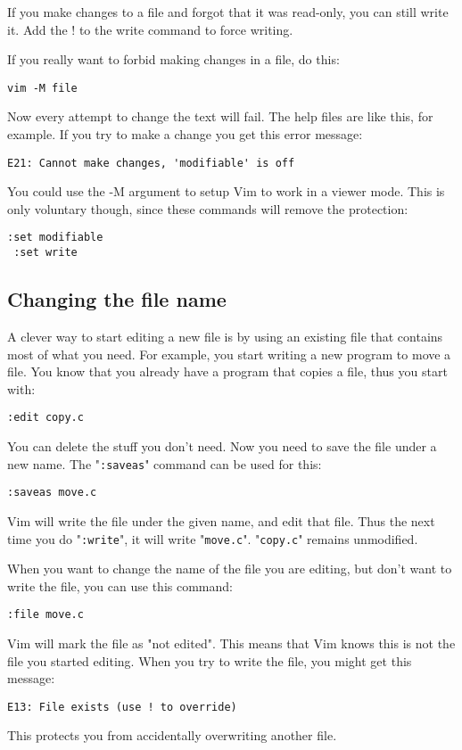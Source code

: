 If you make changes to a file and forgot that it was read-only, you can still write it.
Add the ! to the write command to force writing.

If you really want to forbid making changes in a file, do this:

 \begin{Verbatim}[samepage=true]
 vim -M file
 \end{Verbatim}

Now every attempt to change the text will fail.
The help files are like this, for example.
If you try to make a change you get this error message:

\begin{Verbatim}[samepage=true]
    E21: Cannot make changes, 'modifiable' is off 
\end{Verbatim}

You could use the -M argument to setup Vim to work in a viewer mode.
This is only voluntary though, since these commands will remove the protection:

 \begin{Verbatim}[samepage=true]
 :set modifiable
 :set write
 \end{Verbatim}

\subsection{Changing the file name}
A clever way to start editing a new file is by using an existing file that contains most of what you need.
For example, you start writing a new program to move a file.
You know that you already have a program that copies a file, thus you start with:

 \begin{Verbatim}[samepage=true]
 :edit copy.c
 \end{Verbatim}

You can delete the stuff you don't need.
Now you need to save the file under a new name.
The "\verb!:saveas!" command can be used for this:

 \begin{Verbatim}[samepage=true]
 :saveas move.c
 \end{Verbatim}

Vim will write the file under the given name, and edit that file.
Thus the next time you do "\verb!:write!", it will write "\verb!move.c!".
"\verb!copy.c!" remains unmodified.

When you want to change the name of the file you are editing, but don't want to write the file, you can use this command:

 \begin{Verbatim}[samepage=true]
 :file move.c
 \end{Verbatim}

Vim will mark the file as "not edited".
This means that Vim knows this is not the file you started editing.
When you try to write the file, you might get this message:

\begin{Verbatim}[samepage=true]
    E13: File exists (use ! to override) 
\end{Verbatim}

This protects you from accidentally overwriting another file.
\clearpage
